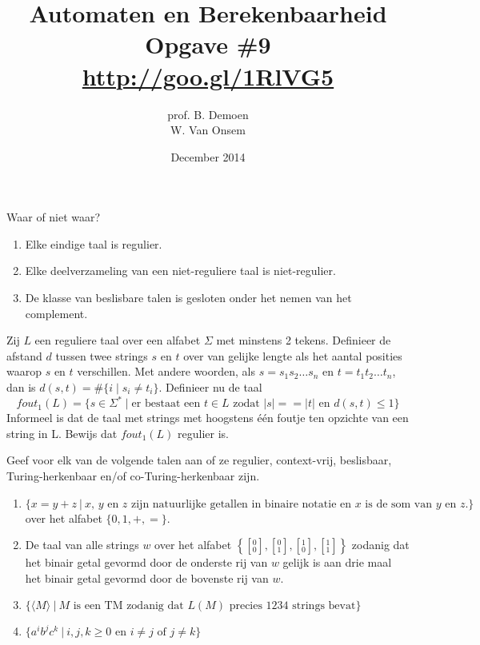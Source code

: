 \documentclass[a4paper]{article}
\title{Automaten en Berekenbaarheid\\Opgave \#9\\\url{http://goo.gl/1RlVG5}}
\author{prof. B. Demoen\\W. Van Onsem}
\date{December 2014}
\newcommand{\twar}[2]{\left[ { }^{#1}_{#2} \right] }
\begin{document}
\maketitle

\begin{question}
Waar of niet waar?
\begin{enumerate}
  \item Elke eindige taal is regulier.
  \item Elke deelverzameling van een niet-reguliere taal is niet-regulier.
  \item De klasse van beslisbare talen is gesloten onder het nemen van het complement.
\end{enumerate}
\begin{answer}

\end{answer}
\end{question}

\begin{question}
Zij $L$ een reguliere taal over een alfabet $\Sigma$ met minstens 2 tekens. Definieer de afstand $d$ tussen twee strings $s$ en $t$ over van gelijke lengte als het aantal posities waarop $s$ en $t$ verschillen. Met andere woorden, als $s = s_1s_2\ldots s_n$ en $t = t_1t_2\ldots t_n$, dan is $d(s,t) = \#\{ i \mid s_i \neq t_i \}$. Definieer nu de taal
\[ fout_1(L) = \{s \in \Sigma^* \mid \text{er bestaat een $t \in L$ zodat $|s| == |t|$ en $d(s,t) \leq 1$} \}\]
Informeel is dat de taal met strings met hoogstens \'e\'en foutje ten opzichte van een string in L. Bewijs dat $fout_1(L)$ regulier is.
\begin{answer}

\end{answer}
\end{question}

\begin{question}
Geef voor elk van de volgende talen aan of ze regulier, context-vrij, beslisbaar, Turing-herkenbaar en/of co-Turing-herkenbaar zijn.
\begin{enumerate}
  \item $\{ x = y+z \  | \ \text{$x$, $y$ en $z$ zijn natuurlijke getallen in binaire notatie en $x$ is de som van $y$ en $z$.} \}$ over het alfabet $\{0,1,+,=\}$.
  \item De taal van alle strings $w$ over het alfabet $\left\{ \twar{0}{0}, \twar{0}{1}, \twar{1}{0}, \twar{1}{1} \right\}$ zodanig dat het binair getal gevormd door de onderste rij van $w$ gelijk is aan drie maal het binair getal gevormd door de bovenste rij van $w$. 
  \item $\{ \langle M \rangle \ | \ \text{$M$ is een TM zodanig dat $L(M)$ precies 1234 strings bevat} \}$ %
  \item $\{ a^ib^jc^k \ | \ \text{$i,j,k \geq 0$ en $i \neq j$ of $j \neq k$} \}$ 
\end{enumerate}
\begin{answer}

\end{answer}
\end{question}
\end{document}
